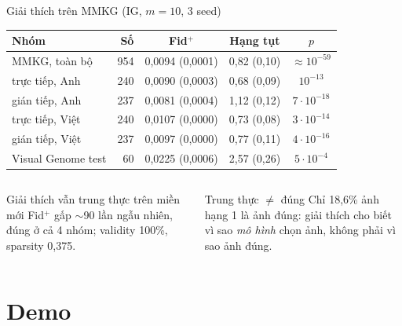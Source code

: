\documentclass[10pt, aspectratio=169]{beamer}
\begin{document}
\begin{frame}{Giải thích trên MMKG (IG, $m = 10$, 3 seed)}
  \centering\small
  \begin{tabular}{l r c c c}
    \toprule
    \textbf{Nhóm} & \textbf{Số} & \textbf{Fid$^+$} & \textbf{Hạng tụt} & $p$ \\
    \midrule
    MMKG, toàn bộ & 954 & 0,0094 (0,0001) & 0,82 (0,10) & $\approx 10^{-59}$ \\
    \quad trực tiếp, Anh & 240 & 0,0090 (0,0003) & 0,68 (0,09) & $10^{-13}$ \\
    \quad gián tiếp, Anh & 237 & 0,0081 (0,0004) & 1,12 (0,12) & $7{\cdot}10^{-18}$ \\
    \quad trực tiếp, Việt & 240 & 0,0107 (0,0000) & 0,73 (0,08) & $3{\cdot}10^{-14}$ \\
    \quad gián tiếp, Việt & 237 & 0,0097 (0,0000) & 0,77 (0,11) & $4{\cdot}10^{-16}$ \\
    \midrule
    Visual Genome test & 60 & 0,0225 (0,0006) & 2,57 (0,26) & $5{\cdot}10^{-4}$ \\
    \bottomrule
  \end{tabular}
  \par{}
  \vfill
  \begin{columns}[T]
      \begin{block}{Giải thích vẫn trung thực trên miền mới}
        Fid$^+$ gấp $\sim$90 lần ngẫu nhiên, đúng ở cả 4 nhóm; validity 100\%, sparsity 0,375.
      \end{block}
      \begin{alertblock}{Trung thực $\neq$ đúng}
        Chỉ 18,6\% ảnh hạng 1 là ảnh đúng: giải thích cho biết vì sao \textit{mô hình} chọn ảnh, không phải vì sao ảnh đúng.
      \end{alertblock}
  \end{columns}
\end{frame}

\section{Demo}
\end{document}

